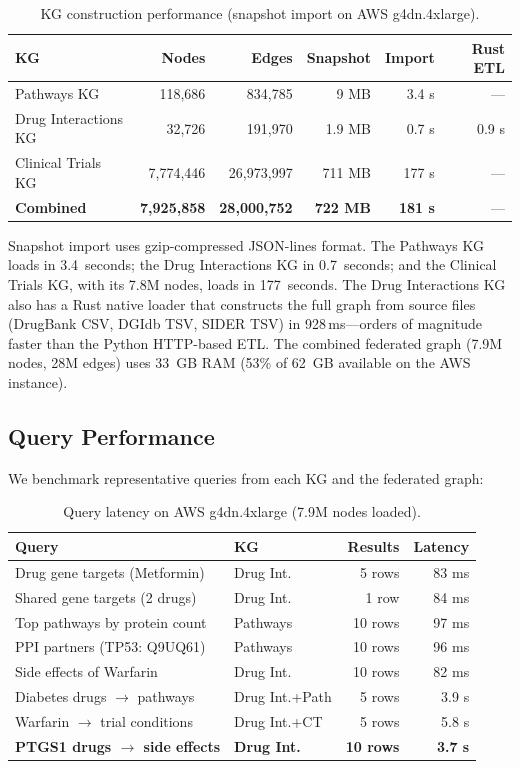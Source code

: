 \documentclass[11pt]{article}
\begin{document}
\begin{table}[H]
\centering
\caption{KG construction performance (snapshot import on AWS g4dn.4xlarge).}
\label{tab:construction}
\small
\begin{tabular}{lrrrrr}
\toprule
\textbf{KG} & \textbf{Nodes} & \textbf{Edges} & \textbf{Snapshot} & \textbf{Import} & \textbf{Rust ETL} \\
\midrule
Pathways KG & 118,686 & 834,785 & 9 MB & 3.4 s & --- \\
Drug Interactions KG & 32,726 & 191,970 & 1.9 MB & 0.7 s & 0.9 s \\
Clinical Trials KG & 7,774,446 & 26,973,997 & 711 MB & 177 s & --- \\
\midrule
\textbf{Combined} & \textbf{7,925,858} & \textbf{28,000,752} & \textbf{722 MB} & \textbf{181 s} & --- \\
\bottomrule
\end{tabular}
\end{table}

Snapshot import uses gzip-compressed JSON-lines format. The Pathways KG loads in 3.4~seconds; the Drug Interactions KG in 0.7~seconds; and the Clinical Trials KG, with its 7.8M nodes, loads in 177~seconds. The Drug Interactions KG also has a Rust native loader that constructs the full graph from source files (DrugBank CSV, DGIdb TSV, SIDER TSV) in 928\,ms---orders of magnitude faster than the Python HTTP-based ETL. The combined federated graph (7.9M nodes, 28M edges) uses 33~GB RAM (53\% of 62~GB available on the AWS instance).

\subsection{Query Performance}

We benchmark representative queries from each KG and the federated graph:

\begin{table}[H]
\centering
\caption{Query latency on AWS g4dn.4xlarge (7.9M nodes loaded).}
\label{tab:queries}
\small
\begin{tabular}{p{5cm}lrr}
\toprule
\textbf{Query} & \textbf{KG} & \textbf{Results} & \textbf{Latency} \\
\midrule
Drug gene targets (Metformin) & Drug Int. & 5 rows & 83 ms \\
Shared gene targets (2 drugs) & Drug Int. & 1 row & 84 ms \\
Top pathways by protein count & Pathways & 10 rows & 97 ms \\
PPI partners (TP53: Q9UQ61) & Pathways & 10 rows & 96 ms \\
Side effects of Warfarin & Drug Int. & 10 rows & 82 ms \\
\midrule
Diabetes drugs $\rightarrow$ pathways & Drug Int.+Path & 5 rows & 3.9 s \\
Warfarin $\rightarrow$ trial conditions & Drug Int.+CT & 5 rows & 5.8 s \\
\textbf{PTGS1 drugs $\rightarrow$ side effects} & \textbf{Drug Int.} & \textbf{10 rows} & \textbf{3.7 s} \\
\bottomrule
\end{tabular}
\end{table}
\end{document}
